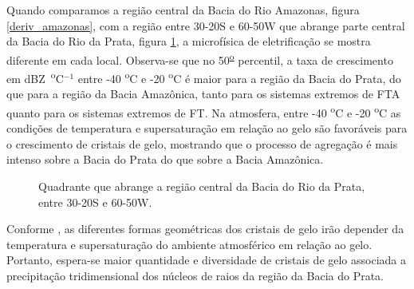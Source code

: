 
Quando comparamos a região central da Bacia do Rio Amazonas, figura \ref{deriv_amazonas}, com a região entre 30-20S e 60-50W que abrange parte central da Bacia do Rio da Prata, figura \ref{deriv_prata}, a microfísica de eletrificação se mostra diferente em cada local. Observa-se que no 50\textsuperscript{\underline{o}} percentil, a taxa de crescimento em dBZ~\textsuperscript{o}C$^{-1}$ entre -40 \textsuperscript{o}C e -20 \textsuperscript{o}C é maior para a região da Bacia do Prata, do que para a região da Bacia Amazônica, tanto para os sistemas extremos de FTA quanto para os sistemas extremos de FT. Na atmosfera, entre -40 \textsuperscript{o}C e -20 \textsuperscript{o}C as condições de temperatura e supersaturação em relação ao gelo são favoráveis para o crescimento de cristais de gelo, mostrando que o processo de agregação é mais intenso sobre a Bacia do Prata do que sobre a Bacia Amazônica.


\begin{figure}[!ht]
\centering
{}
\caption{Quadrante que abrange a região central da Bacia do Rio da Prata, entre 30-20S e 60-50W.}
\label{deriv_prata}
\end{figure}


Conforme , as diferentes formas geométricas dos cristais de gelo irão depender da temperatura e supersaturação do ambiente atmosférico em relação ao gelo. Portanto, espera-se maior quantidade e diversidade de cristais de gelo associada a precipitação tridimensional dos núcleos de raios  da região da Bacia do Prata.

